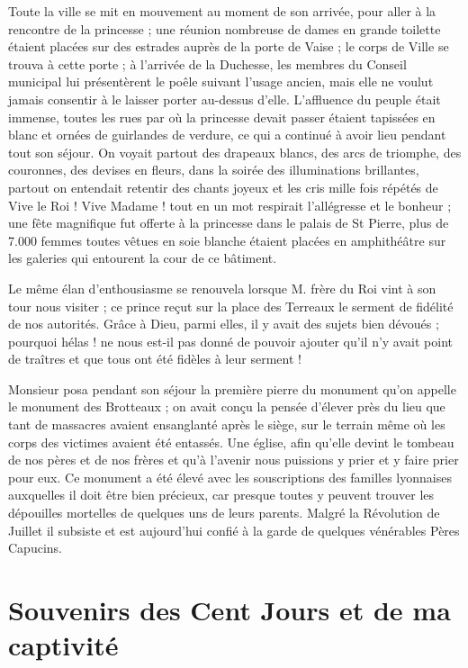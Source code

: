 \documentclass[11pt,a4paper]{report}
\begin{document}
Toute la ville se mit en mouvement au moment de son arrivée, pour aller à la rencontre de la princesse ; une réunion nombreuse de dames en grande toilette étaient placées sur des estrades auprès de la porte de Vaise ; le corps de Ville se trouva à cette porte ; à l'arrivée de la Duchesse, les membres du Conseil municipal lui présentèrent le poêle suivant l'usage ancien, mais elle ne voulut jamais consentir à le laisser porter au-dessus d'elle. L'affluence du peuple était immense, toutes les rues par où la princesse devait passer étaient tapissées en blanc et ornées de guirlandes de verdure, ce qui a continué à avoir lieu pendant tout son séjour. On voyait partout des drapeaux blancs, des arcs de triomphe, des couronnes, des devises en fleurs, dans la soirée des illuminations brillantes, partout on entendait retentir des chants joyeux et les cris mille fois répétés de Vive le Roi ! Vive Madame ! tout en un mot respirait l'allégresse et le bonheur ; une fête magnifique fut offerte à la princesse dans le palais de St Pierre, plus de 7.000 femmes toutes vêtues en soie blanche étaient placées en amphithéâtre sur les galeries qui entourent la cour de ce bâtiment.

Le même élan d'enthousiasme se renouvela lorsque M. frère du Roi vint à son tour nous visiter ; ce prince reçut sur la place des Terreaux le serment de fidélité de nos autorités. Grâce à Dieu, parmi elles, il y avait des sujets bien dévoués ; pourquoi hélas ! ne nous est-il pas donné de pouvoir ajouter qu'il n'y avait point de traîtres et que tous ont été fidèles à leur serment !

Monsieur posa pendant son séjour la première pierre du monument qu'on appelle le monument des Brotteaux ; on avait conçu la pensée d'élever près du lieu que tant de massacres avaient ensanglanté après le siège, sur le terrain même où les corps des victimes avaient été entassés. Une église, afin qu'elle devint le tombeau de nos pères et de nos frères et qu'à l'avenir nous puissions y prier et y faire prier pour eux. Ce monument a été élevé avec les souscriptions des familles lyonnaises auxquelles il doit être bien précieux, car presque toutes y peuvent trouver les dépouilles mortelles de quelques uns de leurs parents. Malgré la Révolution de Juillet il subsiste et est aujourd'hui confié à la garde de quelques vénérables Pères Capucins.

\chapter{Souvenirs des Cent Jours et de ma captivité}
\end{document}
